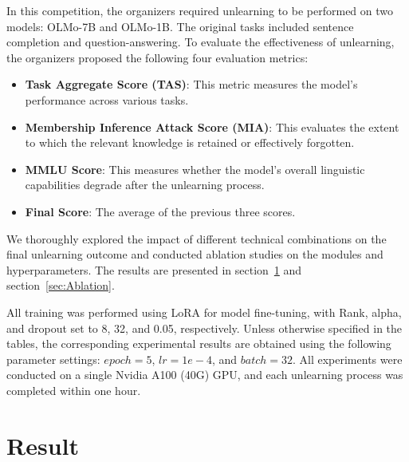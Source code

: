 \documentclass[11pt]{article}
\begin{document}
In this competition, the organizers required unlearning to be performed on two models: OLMo-7B and OLMo-1B. The original tasks included sentence completion and question-answering. To evaluate the effectiveness of unlearning, the organizers proposed the following four evaluation metrics:
\begin{itemize}
	\item \textbf{Task Aggregate Score (TAS)}: This metric measures the model's performance across various tasks.
	\item \textbf{Membership Inference Attack Score (MIA)}: This evaluates the extent to which the relevant knowledge is retained or effectively forgotten.
	\item \textbf{MMLU Score}: This measures whether the model's overall linguistic capabilities degrade after the unlearning process.
	\item \textbf{Final Score}: The average of the previous three scores.
\end{itemize}

We thoroughly explored the impact of different technical combinations on the final unlearning outcome and conducted ablation studies on the modules and hyperparameters. The results are presented in section~\ref{sec:Result} and section~\ref{sec:Ablation}.

All training was performed using LoRA \cite{hu2022lora} for model fine-tuning, with Rank, alpha, and dropout set to 8, 32, and 0.05, respectively. Unless otherwise specified in the tables, the corresponding experimental results are obtained using the following parameter settings: $epoch=5$, $lr=1e-4$, and $batch=32$. All experiments were conducted on a single Nvidia A100 (40G) GPU, and each unlearning process was completed within one hour.

\section{Result}
\label{sec:Result}


\end{document}
